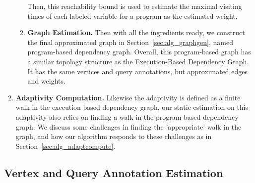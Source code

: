 \begin{enumerate}
\begin{enumerate}
  Then, this reachability bound is used to estimate the maximal visiting times of each labeled variable for a program as the estimated weight.
\item  \textbf{Graph Estimation.} 
Then with all the ingredients ready, we construct the final approximated graph in Section~\ref{sec:alg_graphgen}, named program-based dependency graph. 
Overall, this program-based graph has a similar topology structure as 
the Execution-Based Dependency Graph. It has the same
vertices and query annotations, but approximated edges and weights. 
\end{enumerate}

\item \textbf{Adaptivity Computation.} 
Likewise the adaptivity is defined as a finite walk in the execution based dependency graph, our static estimation on this adaptivity also relies on finding a walk in the program-based dependency graph.  
We discuss some challenges in finding the 'appropriate' walk in the graph, and how our algorithm responds to these challenges as
in Section~\ref{sec:alg_adaptcompute}.
\end{enumerate}

\subsection{Vertex and Query Annotation Estimation}
\label{sec:alg_vertexgen}
